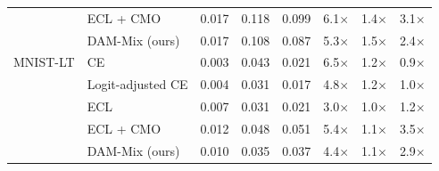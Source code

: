 \begin{tabular}{ll rrr rr r}
 & ECL + CMO & 0.017 & 0.118 & 0.099 & 6.1$\times$ & 1.4$\times$ & 3.1$\times$ \\
 & DAM-Mix (ours) & 0.017 & 0.108 & 0.087 & 5.3$\times$ & 1.5$\times$ & 2.4$\times$ \\
\addlinespace
MNIST-LT & CE & 0.003 & 0.043 & 0.021 & 6.5$\times$ & 1.2$\times$ & 0.9$\times$ \\
 & Logit-adjusted CE & 0.004 & 0.031 & 0.017 & 4.8$\times$ & 1.2$\times$ & 1.0$\times$ \\
 & ECL & 0.007 & 0.031 & 0.021 & 3.0$\times$ & 1.0$\times$ & 1.2$\times$ \\
 & ECL + CMO & 0.012 & 0.048 & 0.051 & 5.4$\times$ & 1.1$\times$ & 3.5$\times$ \\
 & DAM-Mix (ours) & 0.010 & 0.035 & 0.037 & 4.4$\times$ & 1.1$\times$ & 2.9$\times$ \\
\bottomrule
\end{tabular}
